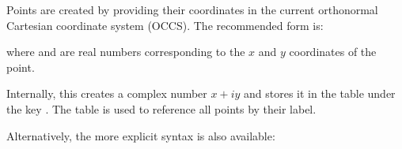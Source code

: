 Points are created by providing their coordinates in the current orthonormal Cartesian coordinate system (OCCS). The recommended form is:

\begin{mybox}
\end{mybox}

where  and  are real numbers corresponding to the $x$ and $y$ coordinates of the point.

\medskip
\noindent
Internally, this creates a complex number $x + i y$ and stores it in the table  under the key . The table  is used to reference all points by their label.

\medskip
\noindent
Alternatively, the more explicit syntax is also available:

\begin{center}
\end{center}

